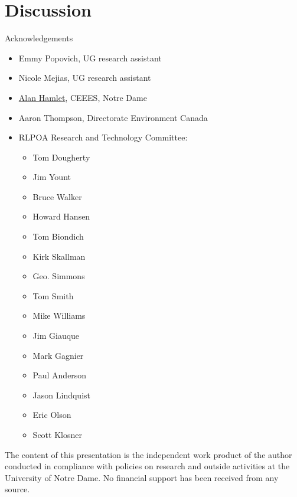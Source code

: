\documentclass[compress,english]{beamer}
\begin{document}
{{{{{\section{Discussion}
}

\begin{frame}{Acknowledgements}
\begin{small}
\begin{itemize}
\item Emmy Popovich, UG research assistant
\item Nicole Mejias, UG research assistant
\item \href{http://engineering.nd.edu/profiles/ahamlet/}{Alan Hamlet}, CEEES, Notre Dame
\item Aaron Thompson, Directorate Environment Canada
\item RLPOA Research and Technology Committee:
\begin{multicols}{3}
\begin{itemize}
\item Tom Dougherty
\item Jim Yount
\item Bruce Walker
\item Howard Hansen
\item Tom Biondich
\item Kirk Skallman
\item Geo. Simmons
\item Tom Smith
\item Mike Williams
\item Jim Giauque
\item Mark Gagnier
\item Paul Anderson
\item Jason Lindquist
\item Eric Olson
\item Scott Klosner
\end{itemize}
\end{multicols}
\end{itemize}
\end{small}

\begin{footnotesize}
The content of this presentation is the independent work product of the author conducted in compliance with policies on research and outside activities at the University of Notre Dame. No financial support has been received from any source.
\end{footnotesize}


\end{frame}}}}}
\end{document}
